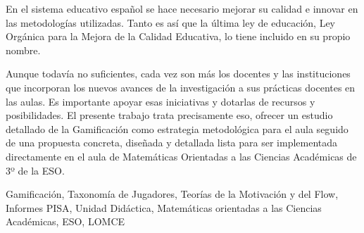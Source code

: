 

En el sistema educativo español se hace necesario mejorar su calidad e innovar en las metodologías utilizadas. 
%
Tanto es así que la última ley de educación, Ley Orgánica para la Mejora de la Calidad Educativa, lo tiene incluido en su propio nombre.

Aunque todavía no suficientes, cada vez son más los docentes y las instituciones que incorporan los nuevos avances de la investigación a sus prácticas docentes en las aulas.
%
Es importante apoyar esas iniciativas y dotarlas de recursos y posibilidades.
%
El presente trabajo trata precisamente eso, ofrecer un estudio detallado de la Gamificación como estrategia metodológica para el aula seguido de una propuesta concreta, diseñada y detallada lista para ser implementada directamente en el aula de Matemáticas Orientadas a las Ciencias Académicas de 3º de la ESO.


\begin{keywordsEs}
Gamificación, Taxonomía de Jugadores, Teorías de la Motivación y del Flow, Informes PISA, Unidad Didáctica, Matemáticas orientadas a las Ciencias Académicas, ESO, LOMCE
\end{keywordsEs}
